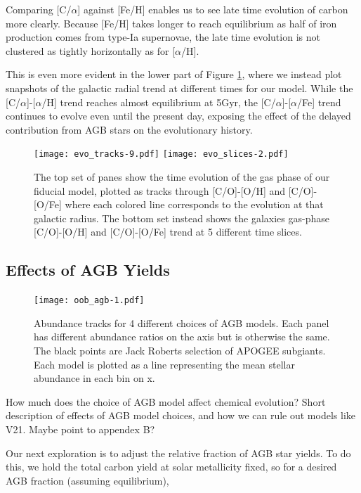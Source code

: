 \documentclass[fleqn,usenatbib]{mnras}
\begin{document}
Comparing [C/$\alpha$] against [Fe/H] enables us to see late time evolution of carbon more clearly. Because [Fe/H] takes longer to reach equilibrium as half of iron production comes from type-Ia supernovae, the late time evolution is not clustered as tightly horizontally as for [$\alpha$/H].

This is even more evident in the lower part of Figure \ref{fig:c_evo}, where we instead plot snapshots of the galactic radial trend at different times for our model. While the [C/$\alpha$]-[$\alpha$/H] trend reaches almost equilibrium at 5Gyr, the [C/$\alpha$]-[$\alpha$/Fe] trend continues to evolve even until the present day, exposing the effect of the delayed contribution from AGB stars on the evolutionary history.

\begin{figure}
\label{fig:c_evo}
\texttt{[image: evo\_tracks-9.pdf]}
\texttt{[image: evo\_slices-2.pdf]}
\caption{The top set of panes show the time evolution of the gas phase of our fiducial model, plotted as tracks through [C/O]-[O/H] and [C/O]-[O/Fe] where each colored line corresponds to the evolution at that galactic radius. 
The bottom set instead shows the galaxies gas-phase [C/O]-[O/H] and [C/O]-[O/Fe] trend at 5 different time slices. 
}
\end{figure}




\subsection{Effects of AGB Yields}
\begin{figure}
\texttt{[image: oob\_agb-1.pdf]}

\caption{Abundance tracks for 4 different choices of AGB models. Each panel has different abundance ratios on the axis but is otherwise the same. The black points are Jack Roberts selection of APOGEE subgiants. Each model is plotted as a line representing the mean stellar abundance in each bin on x.}
\label{fig:stars_abundances}
\end{figure}


How much does the choice of AGB model affect chemical evolution? 
Short description of effects of AGB model choices, and how we can rule out models like V21.  Maybe point to appendex B?


Our next exploration is to adjust the relative fraction of AGB star yields. To do this, we hold the total carbon yield at solar metallicity fixed, so for a desired AGB fraction (assuming equilibrium), 
\end{document}
